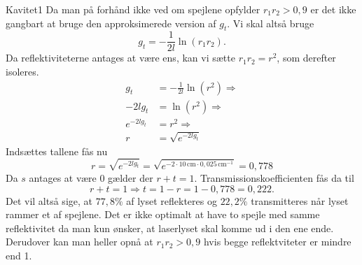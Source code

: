 \begin{opgave}{Kavitet}{1}
\opg Da man på forhånd ikke ved om spejlene opfylder $r_1r_2>0,9$ er det ikke gangbart at bruge den approksimerede version af $g_t$. Vi skal altså bruge 
\begin{equation}
g_t = -\frac{1}{2l}\ln(r_1r_2). 
\end{equation}
Da reflektiviteterne antages at være ens, kan vi sætte $r_1r_2=r^2$, som derefter isoleres. 
\begin{align}
g_t &= -\frac{1}{2l}\ln(r^2) 
\Rightarrow\\ -2lg_t &=\ln(r^2) 
\Rightarrow\\ e^{-2lg_t} &=r^2
\Rightarrow\\ r&=\sqrt{e^{-2lg_t}}
\end{align}
Indsættes tallene fås nu
\begin{equation}
r=\sqrt{e^{-2lg_t}} = \sqrt{e^{-2\cdot10\,\text{cm}\cdot0,025\,\text{cm}^{-1}}} = 0,778
\end{equation}
\opg Da $s$ antages at være 0 gælder der $r+t=1$. Transmissionskoefficienten fås da til 
\begin{equation}
r+t=1 \Rightarrow t = 1-r = 1-0,778 = 0,222. 
\end{equation}
Det vil altså sige, at $77,8\%$ af lyset reflekteres og $22,2\%$ transmitteres når lyset rammer et af spejlene. 
\opg Det er ikke optimalt at have to spejle med samme reflektivitet da man kun ønsker, at laserlyset skal komme ud i den ene ende. Derudover kan man heller opnå at $r_1r_2>0,9$ hvis begge reflektviteter er mindre end 1. 
\end{opgave}

